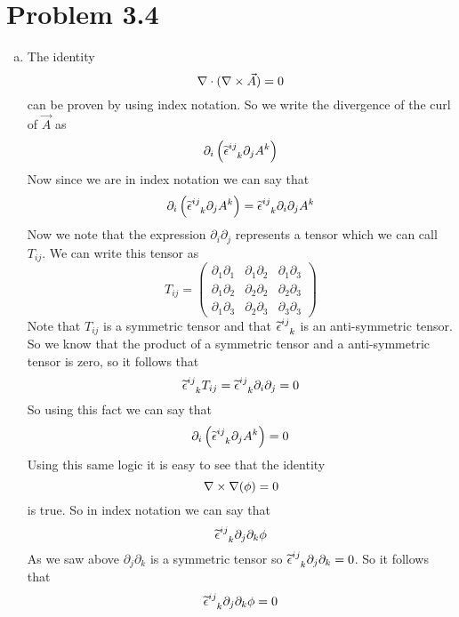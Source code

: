 \documentclass[11pt]{article}
\numberwithin{equation}{section}
\begin{document}
\section{Problem 3.4}
\begin{enumerate}[(a)]
\item
The identity 
$$\bold\nabla\cdot(\bold\nabla\times\vec{A}) = 0$$
can be proven by using index notation. So we write the divergence of the curl of $\vec{A}$ as
$$\partial_i\left(\levi^{ij}_{\ \ k}\partial_jA^k\right)$$
Now since we are in index notation we can say that
$$\partial_i\left(\levi^{ij}_{\ \ k}\partial_jA^k\right) = \levi^{ij}_{\ \ k}\partial_i\partial_jA^k$$
Now we note that the expression $\partial_i\partial_j$ represents a tensor which we can call $T_{ij}$. We can write this tensor as
$$T_{ij} = \left(\begin{array}{ccc}
		\partial_1\partial_1	&\partial_1\partial_2	&\partial_1\partial_3\\
		\partial_1\partial_2	&\partial_2\partial_2	&\partial_2\partial_3\\
		\partial_1\partial_3	&\partial_2\partial_3	&\partial_3\partial_3
	\end{array}\right)$$
Note that $T_{ij}$ is a symmetric tensor and that $\levi^{ij}_{\ \ k}$ is an anti-symmetric tensor. So we know that the product of a symmetric tensor and a anti-symmetric tensor is zero, so it follows that
$$\widetilde{\epsilon}^{ij}_{\ \ k}T_{ij} = \widetilde{\epsilon}^{ij}_{\ \ k}\partial_i\partial_j = 0$$
So using this fact we can say that
$$\partial_i\left(\levi^{ij}_{\ \ k}\partial_jA^k\right) = 0$$
Using this same logic it is easy to see that the identity 
$$\bold\nabla\times\bold\nabla(\phi) = 0$$
is true. So in index notation we can say that
$$\levi^{ij}_{\ \ k}\partial_{j}\partial_k\phi$$
As we saw above $\partial_j\partial_k$ is a symmetric tensor so $\levi^{ij}_{\ \ k}\partial_j\partial_k = 0$. So it follows that
$$\widetilde{\epsilon}^{ij}_{\ \ k}\partial_{j}\partial_k\phi = 0$$


\end{enumerate}
\end{document}
